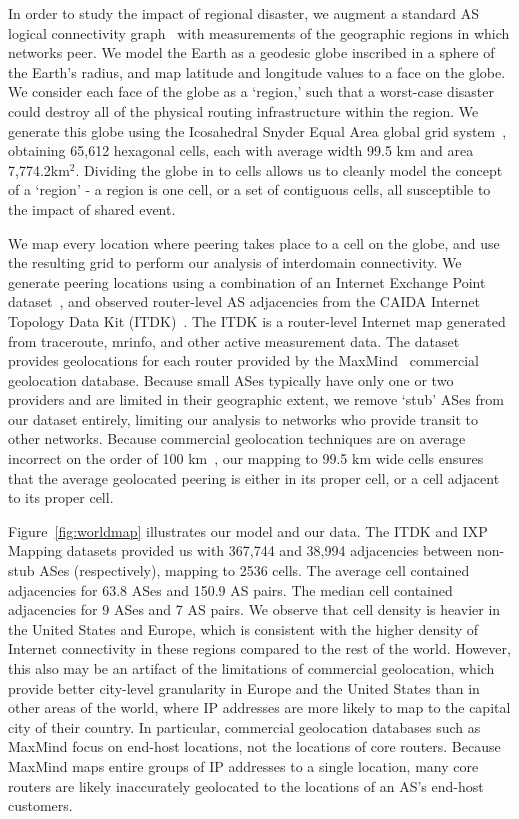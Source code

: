     In order to study the impact of regional disaster, we augment a standard AS logical connectivity graph~\cite{caida-asgraph} with measurements of the geographic regions in which networks peer.
    We model the Earth as a geodesic globe inscribed in a sphere of the Earth's radius, and map latitude and longitude values to a face on the globe.
    We consider each face of the globe as a `region,' such that a worst-case disaster could destroy all of the physical routing infrastructure within the region.
    We generate this globe using the Icosahedral Snyder Equal Area global grid system~\cite{discrete-global-grids}, obtaining 65,612 hexagonal cells, each with average width 99.5 km and area 7,774.2km$^2$.
    Dividing the globe in to cells allows us to cleanly model the concept of a `region' - a region is one cell, or a set of contiguous cells, all susceptible to the impact of shared event. 

    We map every location where peering takes place to a cell on the globe, and use the resulting grid to perform our analysis of interdomain connectivity.
    We generate peering locations using a combination of an Internet Exchange Point dataset~\cite{ixps-mapped}, and observed router-level AS adjacencies from the CAIDA Internet Topology Data Kit (ITDK)~\cite{itdk}.
    The ITDK is a router-level Internet map generated from traceroute, mrinfo, and other active measurement data.
    The dataset provides geolocations for each router provided by the MaxMind~\cite{maxmind} commercial geolocation database.
    Because small ASes typically have only one or two providers and are limited in their geographic extent, we remove `stub' ASes from our dataset entirely, limiting our analysis to networks who provide transit to other networks.
    Because commercial geolocation techniques are on average incorrect on the order of 100 km~\cite{geoloc_accuracy}, our mapping to 99.5 km wide cells ensures that the average geolocated peering is either in its proper cell, or a cell adjacent to its proper cell.
    
    
    Figure~\ref{fig:worldmap} illustrates our model and our data.
    The ITDK and IXP Mapping datasets provided us with 367,744 and 38,994 adjacencies between non-stub ASes (respectively), mapping to 2536 cells.
    The average cell contained adjacencies for 63.8 ASes and 150.9 AS pairs.
    The median cell contained adjacencies for 9 ASes and 7 AS pairs.
    We observe that cell density is heavier in the United States and Europe, which is consistent with the higher density of Internet connectivity in these regions compared to the rest of the world.
    However, this also may be an artifact of the limitations of commercial geolocation, which provide better city-level granularity in Europe and the United States than in other areas of the world, where IP addresses are more likely to map to the capital city of their country.
    In particular, commercial geolocation databases such as MaxMind focus on end-host locations, not the locations of core routers.
    Because MaxMind maps entire groups of IP addresses to a single location, many core routers are likely inaccurately geolocated to the locations of an AS's end-host  customers.

